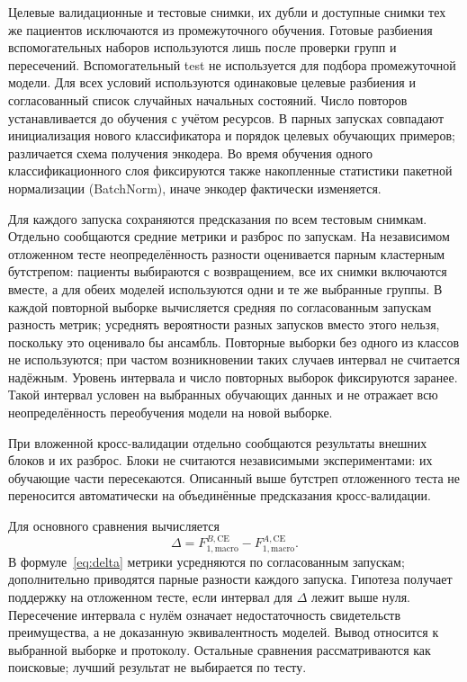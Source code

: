 \documentclass{misisarticle}
\begin{document}
Целевые валидационные и тестовые снимки, их дубли и доступные снимки тех же пациентов исключаются из промежуточного обучения. Готовые разбиения вспомогательных наборов используются лишь после проверки групп и пересечений. Вспомогательный test не используется для подбора промежуточной модели. Для всех условий используются одинаковые целевые разбиения и согласованный список случайных начальных состояний. Число повторов устанавливается до обучения с учётом ресурсов. В парных запусках совпадают инициализация нового классификатора и порядок целевых обучающих примеров; различается схема получения энкодера. Во время обучения одного классификационного слоя фиксируются также накопленные статистики пакетной нормализации (BatchNorm), иначе энкодер фактически изменяется.

Для каждого запуска сохраняются предсказания по всем тестовым снимкам. Отдельно сообщаются средние метрики и разброс по запускам. На независимом отложенном тесте неопределённость разности оценивается парным кластерным бутстрепом: пациенты выбираются с возвращением, все их снимки включаются вместе, а для обеих моделей используются одни и те же выбранные группы. В каждой повторной выборке вычисляется средняя по согласованным запускам разность метрик; усреднять вероятности разных запусков вместо этого нельзя, поскольку это оценивало бы ансамбль. Повторные выборки без одного из классов не используются; при частом возникновении таких случаев интервал не считается надёжным. Уровень интервала и число повторных выборок фиксируются заранее. Такой интервал условен на выбранных обучающих данных и не отражает всю неопределённость переобучения модели на новой выборке.

При вложенной кросс-валидации отдельно сообщаются результаты внешних блоков и их разброс. Блоки не считаются независимыми экспериментами: их обучающие части пересекаются. Описанный выше бутстреп отложенного теста не переносится автоматически на объединённые предсказания кросс-валидации.

Для основного сравнения вычисляется
\begin{equation}
 \Delta=F_{1,\mathrm{macro}}^{B,\mathrm{CE}}
       -F_{1,\mathrm{macro}}^{A,\mathrm{CE}}.
 \label{eq:delta}
\end{equation}
В формуле~\eqref{eq:delta} метрики усредняются по согласованным запускам; дополнительно приводятся парные разности каждого запуска. Гипотеза получает поддержку на отложенном тесте, если интервал для $\Delta$ лежит выше нуля. Пересечение интервала с нулём означает недостаточность свидетельств преимущества, а не доказанную эквивалентность моделей. Вывод относится к выбранной выборке и протоколу. Остальные сравнения рассматриваются как поисковые; лучший результат не выбирается по тесту.
\end{document}
